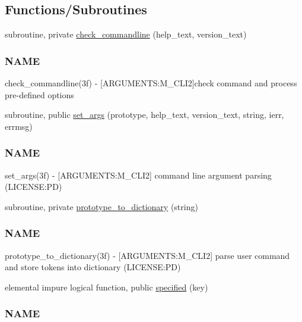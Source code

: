 \subsection*{Functions/\+Subroutines}
\begin{DoxyCompactItemize}
\item 
subroutine, private \mbox{\hyperlink{namespacem__cli2_ada8b5e7a86778085f55821ec31c5977a}{check\+\_\+commandline}} (help\+\_\+text, version\+\_\+text)
\begin{DoxyCompactList}\small\item\em \subsubsection*{N\+A\+ME}

check\+\_\+commandline(3f) -\/ \mbox{[}A\+R\+G\+U\+M\+E\+N\+TS\+:M\+\_\+\+C\+L\+I2\mbox{]}check command and process pre-\/defined options \end{DoxyCompactList}\item 
subroutine, public \mbox{\hyperlink{namespacem__cli2_a54449bc83be4ddc46746a6a33b590c40}{set\+\_\+args}} (prototype, help\+\_\+text, version\+\_\+text, string, ierr, errmsg)
\begin{DoxyCompactList}\small\item\em \subsubsection*{N\+A\+ME}

set\+\_\+args(3f) -\/ \mbox{[}A\+R\+G\+U\+M\+E\+N\+TS\+:M\+\_\+\+C\+L\+I2\mbox{]} command line argument parsing (L\+I\+C\+E\+N\+SE\+:PD) \end{DoxyCompactList}\item 
subroutine, private \mbox{\hyperlink{namespacem__cli2_a14896d00e509cbc32f4df993a8d6f75b}{prototype\+\_\+to\+\_\+dictionary}} (string)
\begin{DoxyCompactList}\small\item\em \subsubsection*{N\+A\+ME}

prototype\+\_\+to\+\_\+dictionary(3f) -\/ \mbox{[}A\+R\+G\+U\+M\+E\+N\+TS\+:M\+\_\+\+C\+L\+I2\mbox{]} parse user command and store tokens into dictionary (L\+I\+C\+E\+N\+SE\+:PD) \end{DoxyCompactList}\item 
elemental impure logical function, public \mbox{\hyperlink{namespacem__cli2_a90118f308a5120041a5862fca4740367}{specified}} (key)
\begin{DoxyCompactList}\small\item\em \subsubsection*{N\+A\+ME}


\end{DoxyCompactList}
\end{DoxyCompactItemize}
